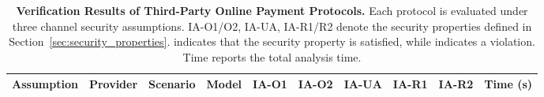 \documentclass[journal]{IEEEtran}
\begin{document}
\begin{table}[t]
\centering
\small
\setlength{\tabcolsep}{6pt}
\renewcommand{\arraystretch}{1.15}

\caption{
      \textbf{Verification Results of Third-Party Online Payment Protocols.}
      Each protocol is evaluated under three channel security assumptions. 
      IA-O1/O2, IA-UA, IA-R1/R2 denote the security properties defined in Section~\ref{sec:security_properties}.
      \textcolor{xgreen}{} indicates that the security property is satisfied, while \textcolor{xred}{} indicates a violation.
      Time reports the total analysis time.
    }
\label{tab:lemma-results}

\begin{tabularx}{\textwidth}{XXXXcccccr}
\toprule

\textbf{Assumption} & \textbf{Provider} & \textbf{Scenario} & \textbf{Model} & \textbf{\; IA-O1 \;} & \textbf{\; IA-O2 \;} & \textbf{\; IA-UA \;} & \textbf{\; IA-R1 \;} & \textbf{\; IA-R2 \;} & \textbf{Time (s)}\\

\midrule


\end{tabularx}
\end{table}
\end{document}
